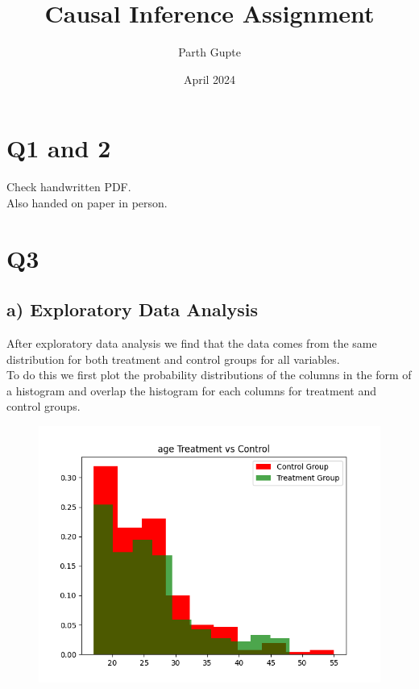 \documentclass{article}
\title{Causal Inference Assignment}
\author{Parth Gupte}
\date{April 2024}
\begin{document}
\maketitle

\section{Q1 and 2}
Check handwritten PDF.\\
Also handed on paper in person.
\section{Q3}
\subsection{a) Exploratory Data Analysis}
After exploratory data analysis we find that the data comes from the same distribution for both treatment and control groups for all variables.\\
To do this we first plot the probability distributions of the columns in the form of a histogram and overlap the histogram for each 
columns for treatment and control groups.\\
\begin{figure}
    \centering
    \includegraphics[width = 15 cm]{../age_cts_hist_plot.png}
\end{figure}
\end{document}
